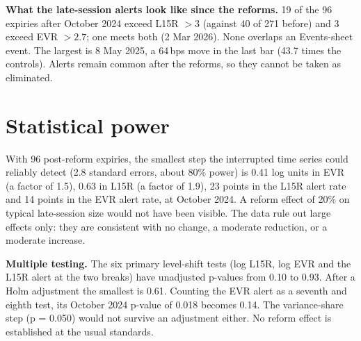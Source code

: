 \documentclass[10pt,a4paper]{article}
\newcommand{\bps}{\,bps\xspace}
\begin{document}
\textbf{What the late-session alerts look like since the reforms.} 19 of the 96 expiries after October 2024 exceed L15R $>3$ (against 40 of 271 before) and 3 exceed EVR $>2.7$; one meets both (2 Mar 2026). None overlaps an Events-sheet event. The largest is 8 May 2025, a 64\bps move in the last bar (43.7 times the controls). Alerts remain common after the reforms, so they cannot be taken as eliminated.

\section*{Statistical power}
With 96 post-reform expiries, the smallest step the interrupted time series could reliably detect (2.8 standard errors, about 80\% power) is 0.41 log units in EVR (a factor of 1.5), 0.63 in L15R (a factor of 1.9), 23 points in the L15R alert rate and 14 points in the EVR alert rate, at October 2024. A reform effect of 20\% on typical late-session size would not have been visible. The data rule out large effects only: they are consistent with no change, a moderate reduction, or a moderate increase.

\textbf{Multiple testing.} The six primary level-shift tests (log L15R, log EVR and the L15R alert at the two breaks) have unadjusted p-values from 0.10 to 0.93. After a Holm adjustment the smallest is 0.61. Counting the EVR alert as a seventh and eighth test, its October 2024 p-value of 0.018 becomes 0.14. The variance-share step (p = 0.050) would not survive an adjustment either. No reform effect is established at the usual standards.
\end{document}
